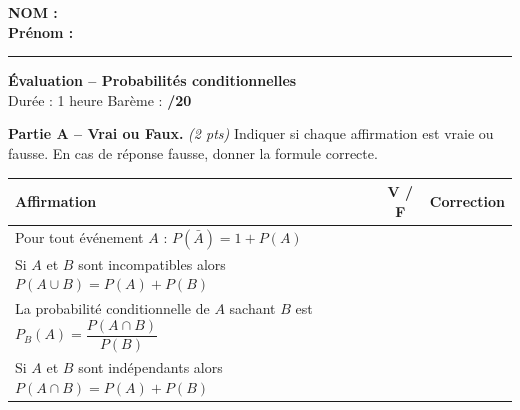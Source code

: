 \documentclass[11pt,a4paper]{article}
\newcounter{numexos}
\newcommand{\bex}[2]{%
\def\bextitle{#1}%
\addtocounter{numexos}{1}%
\begin{tcolorbox}[
  enhanced,
  colback=white,colframe=exoheader,
  colbacktitle=exoheader,coltitle=white,
  fonttitle=\bfseries,
  title={Exercice~\thenumexos\ifx\bextitle\empty\else~--~~#1\fi},
  boxrule=0.8pt,arc=3pt,
  left=4mm,right=4mm,top=1mm,bottom=2mm]%
  #2%
\end{tcolorbox}}
\renewcommand{\arraystretch}{1.6}
\begin{document}
\textbf{NOM :} \underline{\hspace{6cm}} \hfill \\[2mm]
\textbf{Prénom :} \underline{\hspace{5.5cm}}\\[4mm]
\hrule
\vspace{3mm}

\begin{titrebox}
\begin{center}
\textbf{\LARGE Évaluation -- Probabilités conditionnelles}\\[2mm]
\large Durée : 1 heure \hfill Barème : \textbf{/20}
\end{center}
\end{titrebox}

\vfill 

\bex{Vocabulaire \hfill \textit{4 points}}{%
\smallskip
\textbf{Partie A -- Vrai ou Faux.} \textit{(2 pts)}
Indiquer si chaque affirmation est vraie ou fausse. En cas de réponse fausse, donner la formule correcte.
}

\begin{center}

\renewcommand{\arraystretch}{2.0}
\begin{tabular}{|L{8.5cm}|c|L{5cm}|}
\hline
{}\textbf{Affirmation} & \textbf{V / F} & \textbf{Correction} \\
\hline
Pour tout événement $A$ : $P(\bar{A}) = 1 + P(A)$ & & \\
\hline
Si $A$ et $B$ sont incompatibles alors $P(A \cup B) = P(A) + P(B)$ & & \\
\hline
La probabilité conditionnelle de $A$ sachant $B$ est
$P_B(A) = \dfrac{P(A \cap B)}{P(B)}$ & & \\
\hline
Si $A$ et $B$ sont indépendants alors $P(A \cap B) = P(A) + P(B)$ & & \\
\hline
\end{tabular}
    
\end{center}

\vfill 
\end{document}
